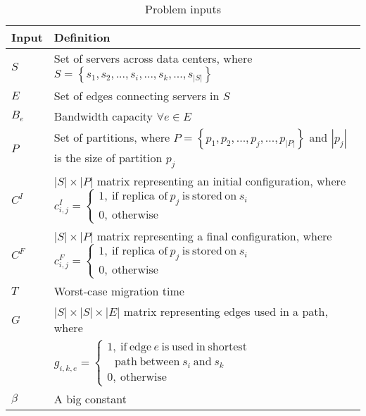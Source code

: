 \begin{table} [!htb]
\caption{Problem inputs}
\begin{tabular}{|m{23pt}|m{208pt}|} 
\hline
	\textbf{Input}
 	& 
	\textbf{Definition}
 \\
\hline
	$S$
 	& 
 	Set of servers across data centers, where $S=\left\{s_1,s_2, ...,s_i, ..., s_k, ..., s_{\left\vert{}S\right\vert{}}\right\}$
\\ 
 
\hline
	$E$
 	& 
 	Set of edges connecting servers in $S$
\\

\hline
	$B_e$
	& 
	Bandwidth capacity $\forall{}e\in{}E$
\\

\hline
 	$P$
	& 
	Set of partitions, where $P=\left\{p_1,p_2, ...,p_j, ...,p_{\left\vert{}P\right\vert{}}\right\}$ and $\left\vert{}p_j\right\vert{}$ is the size of partition $p_j$ 
 \\

\hline
	$C^I$
	& 
	$
	\left\vert{}S\right\vert{}\times{}\left\vert{}P\right\vert{}
	$ matrix representing an initial configuration, where
	$c_{i,j}^I=\left\{\begin{array}{l}1,\ \mbox{if replica of}\ p_j\ \mbox{is}\ \mbox{stored}\ \mbox{on}\ s_i\ \  \\
	0,\ \mbox{otherwise}\end{array}\right.$

\\

\hline
	$C^F$
	&
	$
	\left\vert{}S\right\vert{}\times{}\left\vert{}P\right\vert{}
	$ matrix representing a final configuration, where $c_{i,j}^F=\left\{\begin{array}{l}1,\ \mbox{if replica of}\ p_j\ \mbox{is}\ \mbox{stored}\ \mbox{on}\ s_i\ \  \\
0,\ \mbox{otherwise}\end{array}\right.$
\\

\hline
	$T$
 	&  
	Worst-case migration time
 \\

\hline
	$G$
	&
	$
	\left\vert{}S\right\vert{}\times{}\left\vert{}S\right\vert{}\times{}\left\vert{}E\right\vert{}$ matrix representing edges used in a path,  where \\ & 
$g_{i,k,e}=\left\{\begin{array}{l}1,\ \mbox{if}\ \mbox{edge}\ e\ \mbox{is}\ \mbox{used}\ \mbox{in}\ \mbox{shortest}\\ \ \  \ 
\mbox{path}\  \mbox{between}\ s_i\ \mbox{and}\ s_k\  \\
0,\ \mbox{otherwise} \end{array}\right.$
 \\

\hline
$\beta{}$
&  
A big constant 
 \\
\hline
\end{tabular}
 \end{table}




